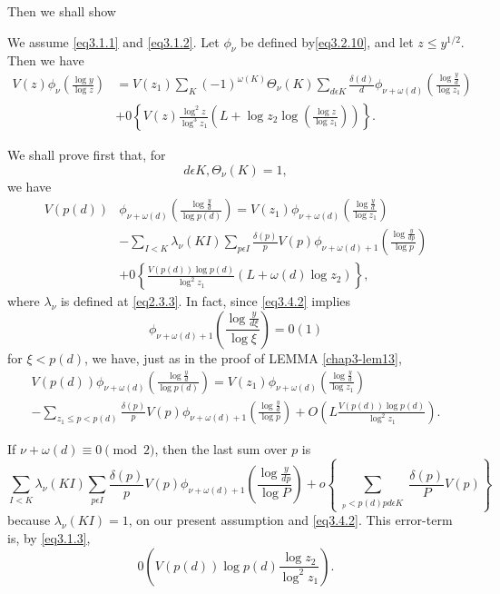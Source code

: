 Then we shall show
\begin{Lemma}\label{chap3-lem15}%
We assume  \eqref{eq3.1.1} and \eqref{eq3.1.2}. Let $\phi_\nu$ be
defined by\break \eqref{eq3.2.10}, 
and let $z \leq y^{1/2}$. Then we have 
  \begin{align*}
    V(z) \phi_\nu \left(\frac{\log y}{\log z}\right) &= V(z_1) \sum_K
    (-1)^{\omega (K)} \Theta_\nu (K) \sum_{d \epsilon  K}
    \frac{\delta (d)}{d} \phi_{\nu + \omega (d)}\left( \frac{\log
      \frac{y}{d}}{\log z_1}\right)\\ 
    & + 0\left\{ V(z) \frac{\log^2 z}{\log^3 z_1}\left(L + \log z_2 \log
    \left(\frac{\log z}{\log z_1}\right) \right) \right\}. 
\end{align*}
\end{Lemma}

We shall prove first that, for
\begin{equation*}
  d \epsilon  K, \Theta_\nu (K) = 1, \tag{3.4.2}\label{eq3.4.2}
\end{equation*}
we have
\begin{align*}
  V(p(d)) &\phi_{\nu + \omega (d)} \left(\frac{\log \frac{y}{d}}{\log p(d)}\right)
  = V (z_1) \phi_{\nu + \omega (d)} \left(\frac{\log \frac{y}{d}}{\log
    z_1}\right)  \\
  & - \sum_{I < K } \lambda_\nu (KI) \sum_{p \epsilon  I}
  \frac{\delta (p)}{p} V(p) \phi_{\nu + \omega (d) + 1}
  \left(\frac{\log \frac{y}{dp}}{\log p}\right)\\ 
  & + 0 \left\{\frac{V(p(d)) \log p(d)}{\log^2 z_1}  (L + \omega (d) \log
  z_2)\right\},\tag{3.4.3}\label{eq3.4.3}  
\end{align*}\pageoriginale
where $\lambda_\nu$ is defined at \eqref{eq2.3.3}. In fact, since
\eqref{eq3.4.2} implies  
$$
\phi_{\nu + \omega (d) + 1} \left(\frac{ \log \frac{y}{d \xi}}{\log
  \xi}\right) = 0(1) 
$$
for $\xi < p(d)$, we have, just as in the proof of LEMMA
\ref{chap3-lem13}, 
\begin{multline*}
  V(p(d)) \phi_{\nu + \omega (d)} \left(\frac{\log \frac{y}{d}}{\log p(d)}\right)
  = V (z_1) \phi_{\nu + \omega (d)} \left(\frac{\log \frac{y}{d}}{\log
    z_1}\right)\\ 
  - \sum_{z_1 \leq p < p(d)} \frac{\delta (p)}{p} V(p) \phi_{\nu +
  \omega (d) + 1 } \left(\frac{\log \frac{y}{d}}{\log p}\right) + O
  \left( L \frac{ V (p(d)) \log p(d)}{\log^2z_1} \right). 
\end{multline*}

If $\nu + \omega (d) \equiv 0 \pmod{2}$, then the last sum over $p$ is
\begin{equation*}
  \sum_{I < K} \lambda_\nu (KI) \sum_{p \epsilon  I} \frac{\delta
    (p)}{p} V(p) \phi_{\nu + \omega (d) + 1} \left(\frac {\log
    \frac{y}{dp}}{\log P}\right) + o\left\{ \sum_{\substack{_p < p (d) pd
      \epsilon  K}} \frac{\delta(p)}{P} V(p) \right\}
  \tag{3.4.4} \label{eq3.4.4} 
\end{equation*}
because $\lambda_\nu (KI) = 1$, on our present assumption and
\eqref{eq3.4.2}. This error-term is, by \eqref{eq3.1.3}, 
\begin{equation*}
  0\left(V (p(d) ) \log p (d) \frac{\log z_2}{\log^2
    z_1}\right). \tag{3.4.5}\label{eq3.4.5} 
\end{equation*}

